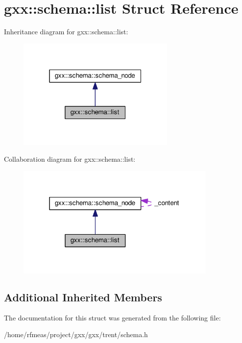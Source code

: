 \hypertarget{structgxx_1_1schema_1_1list}{}\section{gxx\+:\+:schema\+:\+:list Struct Reference}
\label{structgxx_1_1schema_1_1list}


Inheritance diagram for gxx\+:\+:schema\+:\+:list\+:
\nopagebreak
\begin{figure}[H]
\begin{center}
\leavevmode
\includegraphics[width=220pt]{structgxx_1_1schema_1_1list__inherit__graph}
\end{center}
\end{figure}


Collaboration diagram for gxx\+:\+:schema\+:\+:list\+:
\nopagebreak
\begin{figure}[H]
\begin{center}
\leavevmode
\includegraphics[width=279pt]{structgxx_1_1schema_1_1list__coll__graph}
\end{center}
\end{figure}
\subsection*{Additional Inherited Members}


The documentation for this struct was generated from the following file\+:\begin{DoxyCompactItemize}
\item 
/home/rfmeas/project/gxx/gxx/trent/schema.\+h\end{DoxyCompactItemize}
